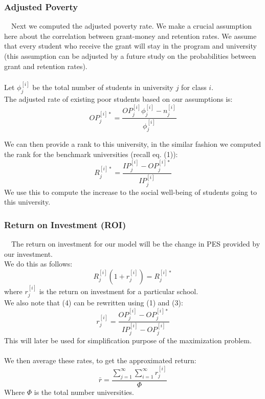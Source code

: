 \documentclass[12pt]{scrartcl}
\begin{document}
	\subsubsection{Adjusted Poverty}
		\ \ Next we computed the adjusted poverty rate. We make a crucial assumption here about the correlation between grant-money and retention rates. We assume that every student who receive the grant will stay in the program and university (this assumption can be adjusted by a future study on the probabilities between grant and retention rates).\\
		\\
		Let $\phi_j^{[i]}$ be the total number of students in university $j$ for class $i$.\\
		The adjusted rate of existing poor students based on our assumptions is:
		\begin{equation}
			OP_j^{[i]*} = \frac{  OP_j^{[i]}\phi_j^{[i]}-n_j^{[i]}  }{ \phi_j^{[i]}  }
		\end{equation}
		
		We can then provide a rank to this university, in the similar fashion we computed the rank for the benchmark universities (recall eq. (1)):
		$$
			R_j^{[i]*}=\frac{IP_j^{[i]}-OP_j^{[i]*}}{IP_j^{[i]}}
		$$
		We use this to compute the increase to the social well-being of students going to this university. 

	\subsubsection{Return on Investment (ROI)}
		\ \ The return on investment for our model will be the change in PES provided by our investment.\\
		We do this as follows:
		\begin{equation}
			R_j^{[i]}(1+r_j^{[i]}) = R_j^{[i]*}
		\end{equation}
		where $r_j^{[i]}$ is the return on investment for a particular school.\\
		We also note that (4) can be rewritten using (1) and (3):
		\begin{equation}
			r_j^{[i]} = \frac{ OP_j^{[i]} - OP_j^{[i]*}  }{ IP_j^{[i]} - OP_j^{[i]}  }
		\end{equation}	
	 	This will later be used for simplification purpose of the maximization problem.\\
		\\
		We then average these rates, to get the approximated return:
		\begin{equation}
			\bar{r} = \frac{ \sum_{j=1}^\infty\sum_{i=1}^\infty r_j^{[i]}  }{ \Phi }
		\end{equation}
		Where $\Phi$ is the total number universities.
		
\end{document}
